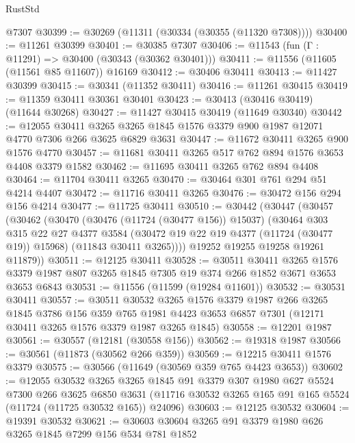 \begin{lexlean}{RustStd}
\begin{coremodule}
    @7307
@30399 := @30269 (@11311 (@30334 (@30355 (@11320 @7308))))
@30400 := @11261 @30399
@30401 := @30385 @7307
@30406 := @11543 (fun (Γ : @11291) => @30400 (@30343 (@30362 @30401)))
@30411 := @11556 (@11605 (@11561 @85 @11607)) @16169
@30412 := @30406 @30411
@30413 := @11427 @30399
@30415 := @30341 (@11352 @30411)
@30416 := @11261 @30415
@30419 := @11359 @30411 @30361 @30401
@30423 := @30413 (@30416 @30419) (@11644 @30268)
@30427 := @11427 @30415 @30419 (@11649 @30340)
@30442 := @12055
    @30411
    @3265
    @3265
    @1845
    @1576
    @3379
    @900
    @1987
    @12071
    @4770
    @7306
    @266
    @3625
    @6829
    @3631
@30447 := @11672 @30411 @3265 @900 @1576 @4770
@30457 := @11681 @30411 @3265 @517 @762 @894 @1576 @3653 @4408 @3379 @1582
@30462 := @11695 @30411 @3265 @762 @894 @4408
@30464 := @11704 @30411 @3265
@30470 := @30464 @301 @761 @294 @51 @4214 @4407
@30472 := @11716 @30411 @3265
@30476 := @30472 @156 @294 @156 @4214
@30477 := @11725 @30411
@30510 := @30442
    (@30447
      (@30457
        (@30462
          (@30470
            (@30476 (@11724 (@30477 @156)) @15037)
            (@30464
              @303
              @315
              @22
              @27
              @4377
              @3584
              (@30472 @19 @22 @19 @4377 (@11724 (@30477 @19)) @15968)
              (@11843 @30411 @3265))))
        @19252
        @19255
        @19258
        @19261
        @11879))
@30511 := @12125 @30411
@30528 := @30511
    @30411
    @3265
    @1576
    @3379
    @1987
    @807
    @3265
    @1845
    @7305
    @19
    @374
    @266
    @1852
    @3671
    @3653
    @3653
    @6843
@30531 := @11556 (@11599 (@19284 @11601))
@30532 := @30531 @30411
@30557 := @30511
    @30532
    @3265
    @1576
    @3379
    @1987
    @266
    @3265
    @1845
    @3786
    @156
    @359
    @765
    @1981
    @4423
    @3653
    @6857
    @7301
    (@12171 @30411 @3265 @1576 @3379 @1987 @3265 @1845)
@30558 := @12201 @1987
@30561 := @30557 (@12181 (@30558 @156))
@30562 := @19318 @1987
@30566 := @30561 (@11873 (@30562 @266 @359))
@30569 := @12215 @30411 @1576 @3379
@30575 := @30566 (@11649 (@30569 @359 @765 @4423 @3653))
@30602 := @12055
    @30532
    @3265
    @3265
    @1845
    @91
    @3379
    @307
    @1980
    @627
    @5524
    @7300
    @266
    @3625
    @6850
    @3631
    (@11716 @30532 @3265 @165 @91 @165 @5524 (@11724 (@11725 @30532 @165)) @24096)
@30603 := @12125 @30532
@30604 := @19391 @30532
@30621 := @30603
    @30604
    @3265
    @91
    @3379
    @1980
    @626
    @3265
    @1845
    @7299
    @156
    @534
    @781
    @1852

\end{coremodule}
\end{lexlean}

